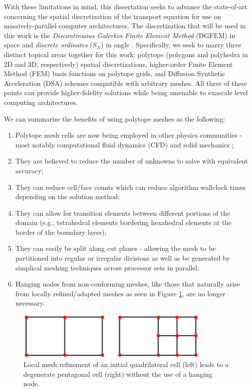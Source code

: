 With these limitations in mind, this dissertation seeks to advance the state-of-art concerning the spatial discretization of the transport equation for use on massively-parallel computer architectures. The discretization that will be used in this work is the {\em Discontinuous Galerkin Finite Element Method} (DGFEM) in space and {\em discrete ordinates} ($S_N$) in angle \cite{johnson1984finite,morel2005s}. Specifically, we seek to marry three distinct topical areas together for this work: polytope (polygons and polyhedra in 2D and 3D, respectively) spatial discretizations, higher-order Finite Element Method (FEM) basis functions on polytope grids, and Diffusion Synthetic Acceleration (DSA) schemes compatible with arbitrary meshes. All three of these points can provide higher-fidelity solutions while being amenable to exascale level computing architectures.

We can summarize the benefits of using polytope meshes as the following:

\begin{enumerate}
	\item Polytope mesh cells are now being employed in other physics communities - most notably computational fluid dynamics (CFD) \cite{ref::star_CCM} and solid mechanics \cite{yip2005automated};
	\item They are believed to reduce the number of unknowns to solve with equivalent accuracy;
	\item They can reduce cell/face counts which can reduce algorithm wallclock times depending on the solution method;
	\item They can allow for transition elements between different portions of the domain (e.g., tetrahedral elements bordering hexahedral elements at the border of the boundary layer);
	\item They can easily be split along cut planes - allowing the mesh to be partitioned into regular or irregular divisions as well as be generated by simplical meshing techniques across processor sets in parallel;
	\item Hanging nodes from non-conforming meshes, like those that naturally arise from locally refined/adapted meshes as seen in Figure \ref{fig::Intro_locally_refined_vertices}, are no longer necessary. 
\end{enumerate}

\begin{figure}
\centering
\includegraphics[width=0.85\textwidth]{figures/sec_Intro/locally_refined_vertices.png}
\caption{Local mesh refinement of an initial quadrilateral cell (left) leads to a degenerate pentagonal cell (right) without the use of a hanging node.}
\label{fig::Intro_locally_refined_vertices}
\end{figure}

